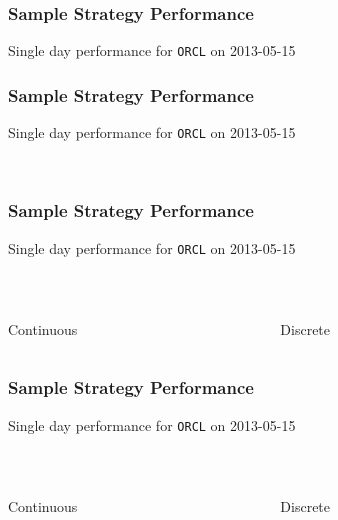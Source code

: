 \begin{frame}[t]
\frametitle{Sample Strategy Performance}
Single day performance for \texttt{ORCL} on 2013-05-15
\begin{center}
\end{center}
\end{frame}
\begin{frame}[t]
\frametitle{Sample Strategy Performance}
Single day performance for \texttt{ORCL} on 2013-05-15
\begin{center}
\\
\end{center}
\end{frame}

\begin{frame}[t]
\frametitle{Sample Strategy Performance}
Single day performance for \texttt{ORCL} on 2013-05-15
\begin{center}
\begin{columns}[T] %
\begin{column}{.5\textwidth}
\\
{\centering\scriptsize Continuous \par}
\end{column}%
\hfill%
\begin{column}{.5\textwidth}
\\
{\centering\scriptsize Discrete \par}
\end{column}%
\end{columns}
\centering
\vspace{\baselineskip}
\end{center}
\end{frame}

\begin{frame}[t]
\frametitle{Sample Strategy Performance}
Single day performance for \texttt{ORCL} on 2013-05-15
\begin{center}
\begin{columns}[T] %
\begin{column}{.5\textwidth}
\\
{\centering\scriptsize Continuous \par}
\end{column}%
\hfill%
\begin{column}{.5\textwidth}
\\
{\centering\scriptsize Discrete \par}
\end{column}%
\end{columns}
\end{center}
\end{frame}

